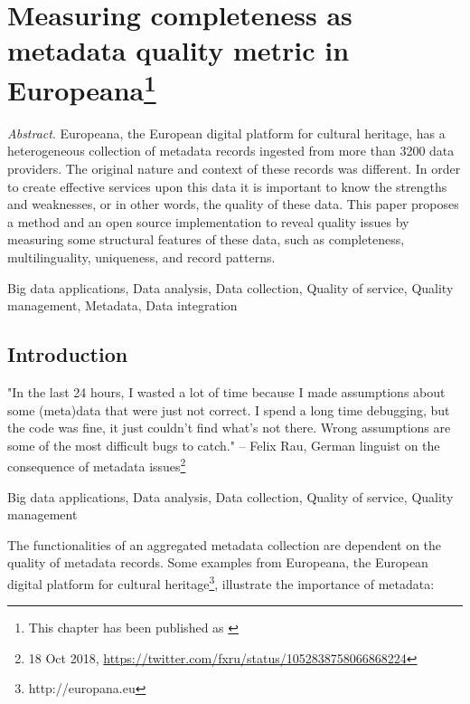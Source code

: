 \chapter[Measuring completeness as metadata quality metric in Europeana]{Measuring completeness as metadata quality metric in Europeana\footnote{This chapter has been published as \cite{kiraly2018}}}

\emph{Abstract}. Europeana, the European digital platform for cultural heritage, has a heterogeneous collection of metadata records ingested from more than 3200 data providers. The original nature and context of these records was different. In order to create effective services upon this data it is important to know the strengths and weaknesses, or in other words, the quality of these data. This paper proposes a method and an open source implementation to reveal quality issues by measuring some structural features of these data, such as completeness, multilinguality, uniqueness, and record patterns.

Big data applications, Data analysis, Data collection, Quality of service, Quality management, Metadata, Data integration

\section{Introduction}

\begin{displayquote}
"In the last 24 hours, I wasted a lot of time because I made assumptions about some (meta)data that were just not correct. I spend a long time debugging, but the code was fine, it just couldn’t find what’s not there. Wrong assumptions are some of the most difficult bugs to catch." -- Felix Rau, German linguist on the consequence of metadata issues\footnote{18 Oct 2018, \url{https://twitter.com/fxru/status/1052838758066868224}}
\end{displayquote}
Big data applications, Data analysis, Data collection, Quality of service, Quality management 
\bigskip

The functionalities of an aggregated metadata collection are dependent on the quality of metadata records. Some examples from Europeana, the European digital platform for cultural heritage\footnote{http://europana.eu}, illustrate the importance of metadata:

